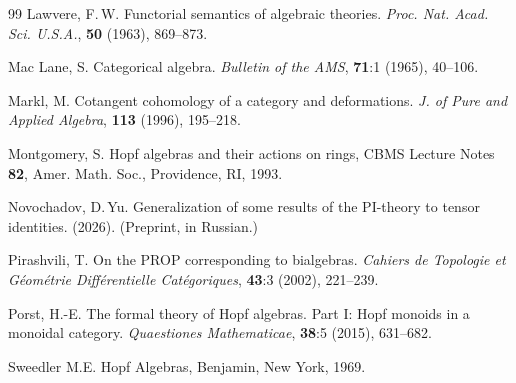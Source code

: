 \documentclass[12pt, reqno, a4paper]{amsart}
\theoremstyle{plain}
\theoremstyle{remark}
\theoremstyle{definition}
\numberwithin{equation}{section}
\begin{document}
\begin{thebibliography}{99}
 Lawvere, F.\,W. Functorial semantics of algebraic theories. \textit{Proc. Nat. Acad.
Sci. U.S.A.}, \textbf{50} (1963), 869--873.

 Mac Lane, S. Categorical algebra. \textit{Bulletin of the AMS}, \textbf{71}:1 (1965), 40--106.

 Markl, M. Cotangent cohomology of a category and deformations. 
\textit{J. of Pure and Applied Algebra}, \textbf{113} (1996), 195--218.


 Montgomery, S. Hopf algebras and their actions on rings, CBMS Lecture Notes \textbf{82}, Amer. Math. Soc., Providence, RI, 1993.

 Novochadov, D.\,Yu. Generalization of some results of the PI-theory to tensor identities. (2026). (Preprint, in Russian.)

 Pirashvili, T. On the PROP corresponding to bialgebras. \textit{Cahiers de Topologie et G\'eom\'etrie Diff\'erentielle Cat\'egoriques}, \textbf{43}:3 (2002), 221--239.

Porst, H.-E. The formal theory of Hopf algebras. Part I: Hopf monoids in a monoidal category.  \textit{Quaestiones Mathematicae}, \textbf{38}:5 (2015), 631--682.

 Sweedler M.E. Hopf Algebras, Benjamin, New York, 1969.

\end{thebibliography}
\end{document}

